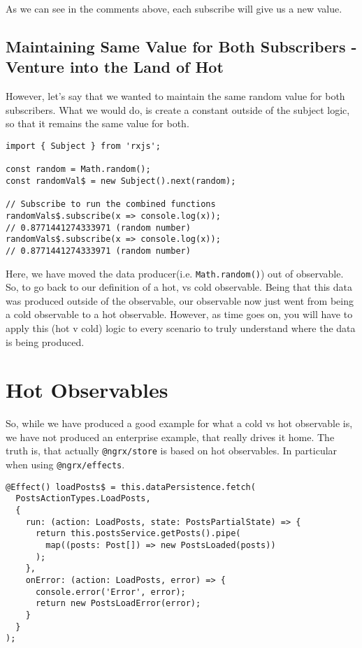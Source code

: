 As we can see in the comments above, each subscribe will give us a new value.

\subsection{Maintaining Same Value for Both Subscribers - Venture into the Land of Hot}
However, let's say that we wanted to maintain the same random value for 
both subscribers. What we would do, is create a constant outside of the 
subject logic, so that it remains the same value for both. 

\begin{lstlisting}[caption=Turning Cold into Hot]
import { Subject } from 'rxjs';

const random = Math.random();
const randomVal$ = new Subject().next(random);

// Subscribe to run the combined functions
randomVals$.subscribe(x => console.log(x));
// 0.8771441274333971 (random number)
randomVals$.subscribe(x => console.log(x));
// 0.8771441274333971 (random number)
\end{lstlisting}

Here, we have moved the data producer(i.e. \lstinline{Math.random()}) out of observable. So, to go back to our definition of a hot, vs cold observable. Being that this data was produced outside of the observable, our observable now just went from being a cold observable to a hot observable. However, as time goes on, you will have to apply this (hot v cold) logic to every scenario to truly understand where the data is being produced.

\section{Hot Observables}
So, while we have produced a good example for what a cold vs hot observable is, we have not produced an enterprise example, that really drives it home. The truth is, that actually \lstinline{@ngrx/store} is based on hot observables. In particular when using \lstinline{@ngrx/effects}. 
\begin{lstlisting}[caption=posts.effects.ts]
@Effect() loadPosts$ = this.dataPersistence.fetch(
  PostsActionTypes.LoadPosts,
  {
    run: (action: LoadPosts, state: PostsPartialState) => {
      return this.postsService.getPosts().pipe(
        map((posts: Post[]) => new PostsLoaded(posts))
      );
    },
    onError: (action: LoadPosts, error) => {
      console.error('Error', error);
      return new PostsLoadError(error);
    }
  }
);  
\end{lstlisting}

